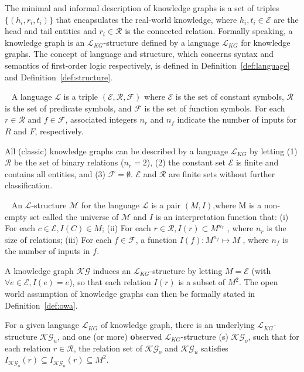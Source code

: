 \documentclass[11pt]{article}
\newcommand{\entity}{\mathcal{E}}
\newcommand{\relation}{\mathcal{R}}
\newcommand{\lang}{\mathcal{L}}
\newcommand{\model}{\mathcal{M}}
\newcommand{\kgnew}{\mathcal{KG}}
\begin{document}
The minimal and informal description of knowledge graphs is a set of triples $\{(h_i, r_i, t_i)\}$ that encapsulates the real-world knowledge, where $h_i, t_i\in \entity$ are the head and tail entities and $r_i\in \relation$ is the connected relation. Formally speaking, a knowledge graph is an $\lang_{KG}$-structure defined by a language $\lang_{KG}$ for knowledge graphs. The concept of language and structure, which concerns syntax and semantics of first-order logic respectively, is defined in Definition~\ref{def:language} and Definition~\ref{def:structure}.

\begin{definition}[Language]~\label{def:language}
    A language $\lang$ is a triple $(\entity, \relation, \mathcal{F})$ where $\entity$ is the set of constant symbols, $\relation$ is the set of predicate symbols, and $\mathcal{F}$ is the set of function symbols. For each $r\in \relation$ and $f\in \mathcal{F}$, associated integers $n_r$ and $n_f$ indicate the number of inputs for $R$ and $F$, respectively.
\end{definition}
All (classic) knowledge graphs can be described by a language $\lang_{KG}$ by letting (1) $\relation$ be the set of binary relations ($n_r=2$), (2) the constant set $\entity$ is finite and contains all entities, and (3) $\mathcal{F} = \emptyset$. $\entity$ and $\relation$ are finite sets without further classification.


\begin{definition}[$\lang$-structure]~\label{def:structure}
    An $\lang$-structure $\model$ for the language $\lang$ is a pair $(M,I)$,where M is a non-empty set called the universe of $\model$ and $I$ is an interpretation function that:
    (i) For each $c\in \entity, I(C)\in M$;
    (ii)  For each $r\in \relation, I(r) \subset M^{n_r}$ , where $n_r$ is the size of relations;
    (iii) For each $f\in \mathcal{F}$, a function $I(f): M^{n_f}\mapsto M$ , where $n_f$ is the number of inputs in $f$.
\end{definition}

A knowledge graph  $\kgnew$ induces an $\lang_{KG}$-structure by letting $M = \entity$ (with $\forall e\in \entity, I(e) = e$), so that each relation $I(r)$ is a subset of $M^2$.
The open world assumption of knowledge graphs can then be formally stated in Definition~\ref{def:owa}.
\begin{definition}\label{def:owa}
For a given language $\lang_{KG}$ of knowledge graph, there is an \textbf{u}nderlying $\lang_{KG}$-structure $\kgnew_u$, and one (or more) \textbf{o}bserved $\lang_{KG}$-structure (s) $\kgnew_o$, such that for each relation $r\in \relation$, the relation set of $\kgnew_o$ and $\kgnew_u$ satisfies $I_{\kgnew_o}(r) \subseteq I_{\kgnew_u}(r) \subseteq M^2$.
\end{definition}
\end{document}
